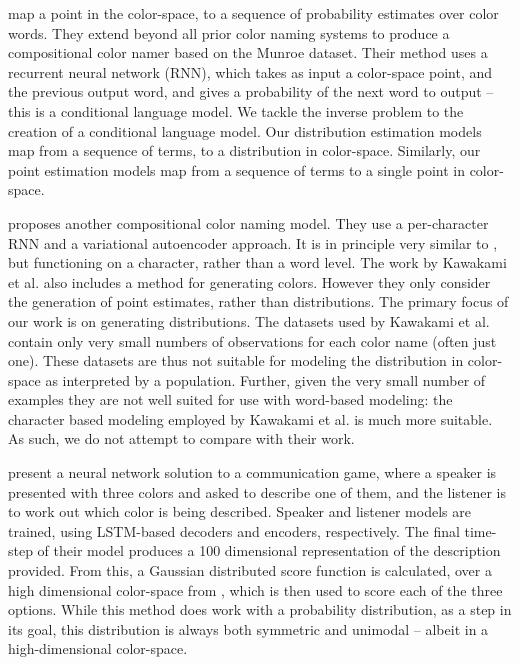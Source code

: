 \documentclass[]{clv3}
\newcommand{\textcite}{\citet}
\begin{document}
\textcite{2016arXiv160603821M} map a point in the color-space, to a sequence of probability estimates over color words.
They extend beyond all prior color naming systems to produce a compositional color namer based on the Munroe dataset.
Their method uses a recurrent neural network (RNN), which takes as input a color-space point, and the previous output word, and gives a probability of the next word to output -- this is a conditional language model.
We tackle the inverse problem to the creation of a conditional language model.
Our distribution estimation models map from a sequence of terms, to a distribution in color-space.
Similarly, our point estimation models map from a sequence of terms to a single point in color-space.


\textcite{DBLP:journals/corr/KawakamiDRS16} proposes another compositional color naming model.
They use a per-character RNN and a variational autoencoder approach.
It is in principle very similar to \textcite{2016arXiv160603821M}, but functioning on a character, rather than a word level.
The work by Kawakami et al. also includes a method for generating colors.
However they only consider the generation of point estimates, rather than distributions.
The primary focus of our work is on generating distributions.
The datasets used by Kawakami et al. contain only very small numbers of observations for each color name (often just one).
These datasets are thus not suitable for modeling the distribution in color-space as interpreted by a population.
Further, given the very small number of examples they are not well suited for use with word-based modeling: the character based modeling employed by Kawakami et al. is much more suitable.
As such, we do not attempt to compare with their work.


\textcite{DBLP:journals/corr/MonroeHGP17} present a neural network solution to a communication game, where a speaker is presented with three colors and asked to describe one of them, and the listener is to work out which color is being described.
Speaker and listener models are trained, using LSTM-based decoders and encoders, respectively.
The final time-step of their model produces a 100 dimensional representation of the description provided.
From this, a Gaussian distributed score function is calculated, over a high dimensional color-space from \textcite{2016arXiv160603821M}, which is then used to score each of the three options.
While this method does work with a probability distribution, as a step in its goal,
this distribution is always both symmetric and unimodal -- albeit in a high-dimensional color-space.
\end{document}
